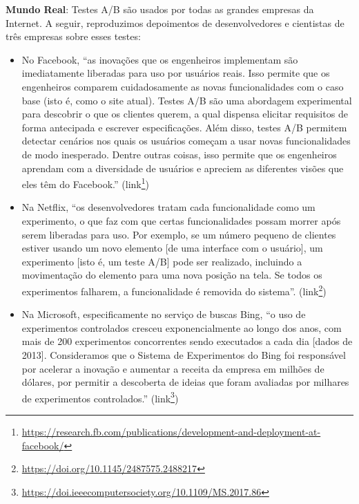 \documentclass[
  11pt,
  twoside]{book}
\DeclareRobustCommand{\href}[2]{#2\footnote{\url{#1}}}
\newenvironment{esmbox}{\centering \vspace{1.5ex} \begin{tcolorbox}[breakable, colback=backcolor, width=4.9in]}{\end{tcolorbox} \vspace{1.5ex}}
\begin{document}
\begin{esmbox}

\textbf{Mundo Real}: Testes A/B são usados por todas as grandes empresas
da Internet. A seguir, reproduzimos depoimentos de desenvolvedores e
cientistas de três empresas sobre esses testes:

\begin{itemize}
\item
  No Facebook,  ``as inovações que os engenheiros
  implementam são imediatamente liberadas para uso por usuários reais.
  Isso permite que os engenheiros comparem cuidadosamente as novas
  funcionalidades com o caso base (isto é, como o site atual). Testes
  A/B são uma abordagem experimental para descobrir o que os clientes
  querem, a qual dispensa elicitar requisitos de forma antecipada e
  escrever especificações. Além disso, testes A/B permitem detectar
  cenários nos quais os usuários começam a usar novas funcionalidades de
  modo inesperado. Dentre outras coisas, isso permite que os engenheiros
  aprendam com a diversidade de usuários e apreciem as diferentes visões
  que eles têm do Facebook.''
  (\href{https://research.fb.com/publications/development-and-deployment-at-facebook/}{link})
\item
  Na Netflix,  ``os desenvolvedores tratam cada
  funcionalidade como um experimento, o que faz com que certas
  funcionalidades possam morrer após serem liberadas para uso. Por
  exemplo, se um número pequeno de clientes estiver usando um novo
  elemento {[}de uma interface com o usuário{]}, um experimento {[}isto
  é, um teste A/B{]} pode ser realizado, incluindo a movimentação do
  elemento para uma nova posição na tela. Se todos os experimentos
  falharem, a funcionalidade é removida do sistema''.
  (\href{https://doi.org/10.1145/2487575.2488217}{link})
\item
  Na Microsoft,  especificamente no serviço de buscas
  Bing, ``o uso de experimentos controlados cresceu exponencialmente ao
  longo dos anos, com mais de 200 experimentos concorrentes sendo
  executados a cada dia {[}dados de 2013{]}. Consideramos que o Sistema
  de Experimentos do Bing foi responsável por acelerar a inovação e
  aumentar a receita da empresa em milhões de dólares, por permitir a
  descoberta de ideias que foram avaliadas por milhares de experimentos
  controlados.''
  (\href{https://doi.ieeecomputersociety.org/10.1109/MS.2017.86}{link})
\end{itemize}

\end{esmbox}
\end{document}
